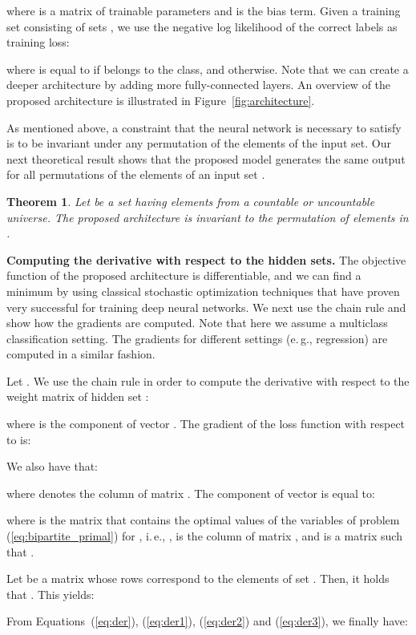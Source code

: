 \documentclass[twoside]{article}
\newcommand{\eg}{e.\,g., }
\newcommand{\ie}{i.\,e., }
\newtheorem{theorem}{Theorem}
\begin{document}
where  is a matrix of trainable parameters and  is the bias term.
Given a training set consisting of sets , we use the negative log likelihood of the correct labels as training loss:

where  is equal to  if  belongs to the  class, and  otherwise.
Note that we can create a deeper architecture by adding more fully-connected layers.
An overview of the proposed architecture is illustrated in Figure~\ref{fig:architecture}.

As mentioned above, a constraint that the neural network is necessary to satisfy is to be invariant under any permutation of the elements of the input set.
Our next theoretical result shows that the proposed model generates the same output for all  permutations of the elements of an input set .
\begin{theorem}
    Let  be a set having elements from a countable or uncountable universe.
    The proposed architecture is invariant to the permutation of elements in .
\end{theorem}


\textbf{Computing the derivative with respect to the hidden sets.}
The objective function of the proposed architecture is differentiable, and we can find a minimum by using classical stochastic optimization techniques that have proven very successful for training deep neural networks.
We next use the chain rule and show how the gradients are computed.
Note that here we assume a multiclass classification setting.
The gradients for different settings (\eg regression) are computed in a similar fashion.

Let .
We use the chain rule in order to compute the derivative with respect to the weight matrix  of hidden set :

where  is the  component of vector .
The gradient of the loss function with respect to  is:

We also have that:

where  denotes the  column of matrix .
The  component of vector  is equal to:

where  is the matrix that contains the optimal values of the variables of problem (\ref{eq:bipartite_primal}) for , \ie ,  is the  column of matrix , and  is a matrix such that .

Let  be a matrix whose rows correspond to the elements of set .
Then, it holds that .
This yields:

From Equations~(\ref{eq:der}), (\ref{eq:der1}), (\ref{eq:der2}) and (\ref{eq:der3}), we finally have: 
\end{document}
